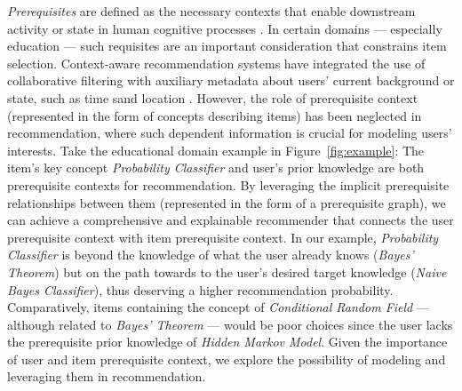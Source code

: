 {\it Prerequisites} are defined as the necessary contexts that enable downstream activity or state in human cognitive processes \cite{laurence1999concepts}. In certain domains --- especially education \cite{ohland2004identifying,vuong2011method,agrawal2016toward} --- such requisites are an important consideration that constrains item selection.
Context-aware recommendation systems have integrated the use of collaborative filtering with auxiliary metadata about users' current background or state, such as time sand location \cite{sun2019research, livne2019deep}.
However, the role of prerequisite context (represented in the form of concepts \cite{laurence1999concepts} describing items) has been neglected in recommendation, where such dependent information is crucial for modeling users' interests.
Take the educational domain example in Figure~\ref{fig:example}:
The item's key concept \textit{Probability Classifier} and user's prior knowledge are both prerequisite contexts for recommendation.
By leveraging the implicit prerequisite relationships between them (represented in the form of a prerequisite graph), we can achieve a comprehensive and explainable recommender that connects the user prerequisite context with item prerequisite context.
In our example, \textit{Probability Classifier} is beyond the knowledge of what the user already knows ({\it Bayes' Theorem}) but on the path towards to the user's desired target knowledge (\textit{Naive Bayes Classifier}), thus deserving a higher recommendation probability.
Comparatively, items containing the concept of {\it Conditional Random Field} --- although related to {\it Bayes' Theorem} --- would be poor choices since the user lacks the prerequisite prior knowledge of {\it Hidden Markov Model}. 
Given the importance of user and item prerequisite context, we explore the possibility of modeling and leveraging them in recommendation.


